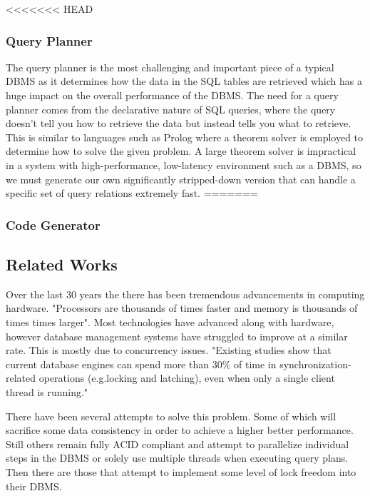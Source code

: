 \documentclass[letterpaper]{article}
\begin{document}
<<<<<<< HEAD
\subsubsection{Query Planner}
The query planner is the most challenging and important piece of a typical DBMS as it
determines how the data in the SQL tables are retrieved which has a huge impact on 
the overall performance of the DBMS. The need for a query planner comes from the 
declarative nature of SQL queries, where the query doesn't tell you how to retrieve the
data but instead tells you what to retrieve. This is similar to languages such as Prolog where
a theorem solver is employed to determine how to solve the given problem. A large theorem 
solver is impractical in a system with high-performance, low-latency environment such as 
a DBMS, so we must generate our own significantly stripped-down version that can handle a 
specific set of query relations extremely fast.
=======
\subsubsection{Code Generator}

\subsection{Related Works}
	Over the last 30 years the there has been tremendous advancements in computing
	hardware. "Processors are thousands of times faster and memory is thousands of
	times times larger"\cite{stonebraker2007end}. Most technologies have advanced 
	along with hardware, however database management systems have struggled to improve
	at a similar rate. This is mostly due to concurrency issues. "Existing studies show
	that current database engines can spend more than 30\% of time in 
	synchronization-related operations (e.g.locking and latching), even when only a 
	single client thread is running."\cite{soares2015database}
   \par\vspace{\baselineskip}
  	There have been several attempts to solve this problem. Some of which will sacrifice
  	some data consistency in order to achieve a higher better performance. Still others
  	remain fully ACID compliant and attempt to parallelize individual steps in the 
  	DBMS or solely use multiple threads when executing query plans. Then there are those
  	that attempt to implement some level of lock freedom into their DBMS.
  	\par\vspace{\baselineskip}
\end{document}
